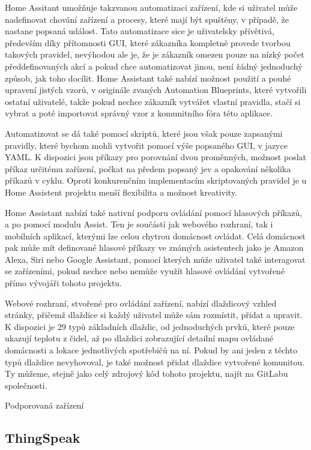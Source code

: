 Home Assitant umožňuje takzvanou automatizaci zařízení, kde si uživatel může nadefinovat chování zařízení a procesy, které mají být spuštěny, v případě, že nastane popsaná událost. Tato automatizace sice je uživatelsky přívětivá, především díky přítomnosti GUI, které zákazníka kompletně provede tvorbou takových pravidel, nevýhodou ale je, že je zákazník omezen pouze na nízký počet předdefinovaných akcí a 
pokud chce automatizovat jinou, není žádný jednoduchý způsob, jak toho docílit. Home Assistant také nabízí možnost použití a pouhé upravení jistých vzorů, v originále zvaných Automation Blueprints, které vytvořili ostatní uživatelé, takže pokud nechce zákazník vytvářet vlastní pravidla, stačí si vybrat a poté importovat správný vzor z komunitního fóra této aplikace.

Automatizovat se dá také pomocí skriptů, které jsou však pouze zapsanými pravidly, které bychom mohli vytvořit pomocí výše popsaného GUI, v jazyce YAML. K dispozici jsou příkazy pro porovnání dvou proměnných, možnost poslat příkaz určitému zařízení, počkat na předem popsaný jev a opakování několika příkazů v cyklu. Oproti konkurenčním implementacím skriptovaných pravidel je u Home Assistent projektu menší flexibilita a možnost kreativity.

Home Assistant nabízí také nativní podporu ovládání pomocí hlasových příkazů, a po pomocí modulu Assist. Ten je součástí jak webového rozhraní, tak i mobilních aplikací, kterými lze celou chytrou domácnost ovládat. Celá domácnost pak může mít definované hlasové příkazy ve známých asistentech jako je Amazon Alexa, Siri nebo Google Assistant, pomocí kterých může uživatel také interagovat se zařízeními, pokud nechce nebo nemůže využít hlasové ovládání vytvořené přímo vývojáři tohoto projektu.

Webové rozhraní, stvořené pro ovládání zařízení, nabízí dlaždicový vzhled stránky, přičemž dlaždice si každý uživatel může sám rozmístit, přidat a upravit. K dispozici je 29 typů základních dlaždic, od jednoduchých prvků, které pouze ukazují teplotu z čidel, až po dlaždici zobrazující detailní mapu ovládané domácnosti a lokace jednotlivých spotřebičů na ní. Pokud by ani jeden z těchto typů dlaždice nevyhovoval, je také možnost přidat dlaždice vytvořené komunitou. Ty můžeme, stejně jako celý zdrojový kód tohoto projektu, najít na GitLabu společnosti.

Podporovaná zařízení

\subsection{ThingSpeak}

